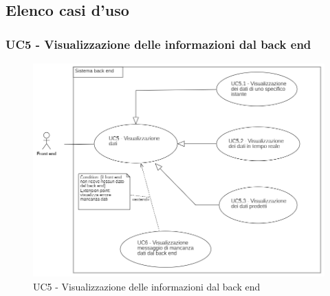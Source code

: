 \subsection{Elenco casi d'uso}\label{FBelencoCasiDuso}


\subsubsection{UC5 - Visualizzazione delle informazioni dal back end}\label{richiestaDati}
\begin{center}
	\begin{figure}[H]
		\includegraphics[scale=0.7]{../immagini/attori_casi/uc5_uc51_uc52_uc53.png}
		\caption{UC5 - Visualizzazione delle informazioni dal back end}
	\end{figure}
\end{center}
